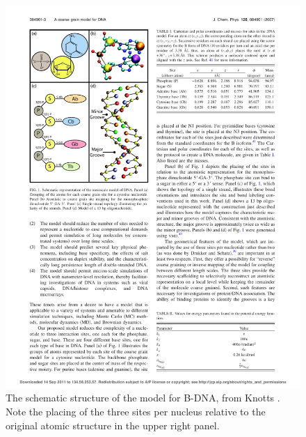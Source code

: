 \begin{figure}[h]
\begin{center}
\includegraphics{images/schematic_structure_knotts}
\caption{The schematic structure of the model for B-DNA, from Knotts \etal \cite{knotts2007coarse}. Note the placing of the three sites per nucleus relative to the original atomic structure in the upper right panel.}
\label{schematic_knotts}
\end{center}
\end{figure}

